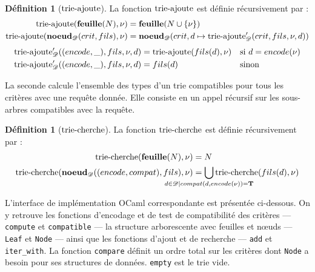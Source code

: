 \documentclass[a4paper]{report}
\theoremstyle{definition}
\newtheorem{definition}[theoreme]{Définition}
\newcommand{\mathhyphen}{{\hbox{-}}}
\begin{document}
{\begin{definition}[$\mathrm{trie\mathhyphen ajoute}$]
  La fonction $\mathrm{trie\mathhyphen ajoute}$ est définie récursivement par :
  \begin{align*}
      \mathrm{trie\mathhyphen ajoute} (\bold{feuille} (N), \nu) &=
      \bold{feuille} (N \cup \{ \nu \})
    \\
      \mathrm{trie\mathhyphen ajoute} (\bold{noeud}_\mathscr{D} (crit, fils), \nu) &=
      \bold{noeud}_\mathscr{D} (crit, d \mapsto \mathrm{trie\mathhyphen ajoute}_\mathscr{D}' (crit, fils, \nu, d))
  \end{align*}
  \begin{align*}
      \mathrm{trie\mathhyphen ajoute}_\mathscr{D}' ((encode, \_), fils, \nu, d) &=
      \mathrm{trie\mathhyphen ajoute} (fils (d), \nu) &&
      \text{si } d = encode (\nu)
    \\
      \mathrm{trie\mathhyphen ajoute}_\mathscr{D}' ((encode, \_), fils, \nu, d) &=
      fils (d) &&
      \text{sinon}
  \end{align*}
\end{definition}

La seconde calcule l'ensemble des types d'un trie compatibles pour tous les critères avec une requête donnée. Elle consiste en un appel récursif sur les sous-arbres compatibles avec la requête.

\begin{definition}[$\mathrm{trie\mathhyphen cherche}$]
  La fonction $\mathrm{trie\mathhyphen cherche}$ est définie récursivement par :
  \begin{align*}
      \mathrm{trie\mathhyphen cherche} (\bold{feuille} (N), \nu) &=
      N
    \\
      \mathrm{trie\mathhyphen cherche} (\bold{noeud}_\mathscr{D} ((encode, compat), fils), \nu) &=
      \bigcup_{\mathclap{{d \in \mathscr{D} \mid compat (d, encode (\nu)) = \bold{T}}}} \mathrm{trie\mathhyphen cherche} (fils (d), \nu)
  \end{align*}
\end{definition}

L'interface de implémentation OCaml correspondante est présentée ci-dessous. On y retrouve les fonctions d'encodage et de test de compatibilité des critères — \texttt{compute} et \texttt{compatible} — la structure arborescente avec feuilles et nœuds — \texttt{Leaf} et \texttt{Node} — ainsi que les fonctions d'ajout et de recherche — \texttt{add} et \texttt{iter_with}. La fonction \texttt{compare} définit un ordre total sur les critères dont \texttt{Node} a besoin pour ses structures de données. \texttt{empty} est le trie vide.

}
\end{document}
